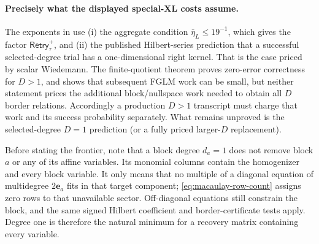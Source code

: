 \documentclass[11pt]{article}
\begin{document}
\paragraph{Precisely what the displayed special-XL costs assume.}
The exponents in  use (i) the aggregate condition
$\bar\eta_L\le19^{-1}$, which gives the factor
$\mathsf{Retry}^{+}_{\tau}$, and (ii) the published Hilbert-series prediction
that a successful selected-degree trial has a one-dimensional right kernel.
That is the case priced by scalar Wiedemann.  The finite-quotient theorem
proves zero-error correctness for $D>1$, and 
shows that subsequent FGLM work can be small, but neither statement prices the
additional block/nullspace work needed to obtain all $D$ border relations.
Accordingly a production $D>1$ transcript must charge that work and its
success probability separately.  What remains unproved is the selected-degree
$D=1$ prediction (or a fully priced larger-$D$ replacement).

Before stating the frontier, note that a block degree $d_a=1$ does not
remove block $a$ or any of its affine variables.  Its monomial columns contain
the homogenizer and every block variable.  It only means that no multiple of a
diagonal equation of multidegree $2\mathbf e_a$ fits in that target component;
\eqref{eq:macaulay-row-count} assigns zero rows to that unavailable sector.
Off-diagonal equations still constrain the block, and the same signed Hilbert
coefficient and border-certificate tests apply.  Degree one is therefore the
natural minimum for a recovery matrix containing every variable.
\end{document}
